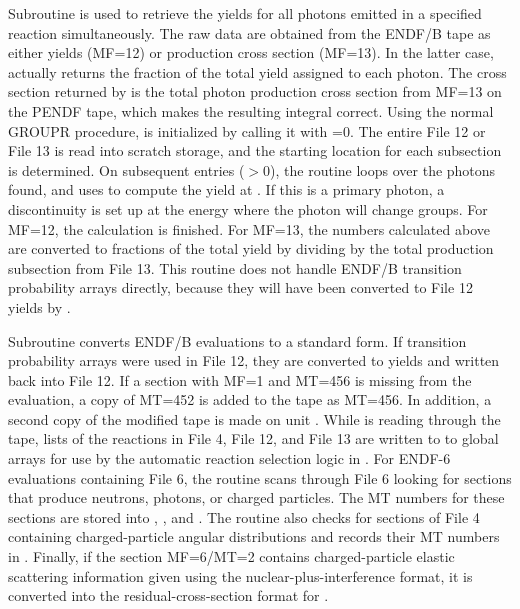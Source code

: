 Subroutine 
is used to retrieve the yields for all photons
emitted in a specified reaction simultaneously.  The raw data are
obtained from the ENDF/B tape as either yields (MF=12) or production
cross section (MF=13).  In the latter case,  actually
returns the fraction of the total yield assigned to each photon.  The
cross section returned by 
is the total photon production cross section from MF=13 on the
PENDF tape, which makes the resulting integral correct.  Using
the normal GROUPR procedure, 
is initialized by calling it with =0.  The entire
File 12 or File 13 is read into scratch storage, and the
starting location for each subsection is determined.  On subsequent entries
($>$0), the routine loops over the  photons found, and
uses  to compute the yield at .  If this is a
primary photon, a discontinuity is set up at the energy where the photon
will change groups.  For MF=12, the calculation is finished.  For MF=13,
the numbers calculated above are converted to fractions of the total yield
by dividing by the total production subsection from File 13.  This routine
does not handle ENDF/B transition probability arrays directly, because
they will have been converted to File 12 yields by
.

Subroutine 
converts ENDF/B evaluations to a standard form.  If transition
probability arrays were used in File 12, they are converted
to yields and written back into File 12.  If a section with MF=1 and
MT=456 is missing from the evaluation, a copy of MT=452 is added to the
tape as MT=456.  In addition, a second copy of the modified tape is made
on unit .  While  is reading through the tape,
lists of the reactions in File 4, File 12, and File 13 are written to
to global arrays for use by the automatic reaction selection logic in
.  For ENDF-6 evaluations containing File 6, the routine
scans through File 6 looking for sections that produce neutrons, photons,
or charged particles.  The MT numbers for these sections are stored into
, , and .  The routine also checks
for sections of File 4 containing charged-particle angular distributions
and records their MT numbers in .  Finally, if the section
MF=6/MT=2 contains charged-particle elastic scattering information given
using the nuclear-plus-interference format, it is converted into the
residual-cross-section format for .

